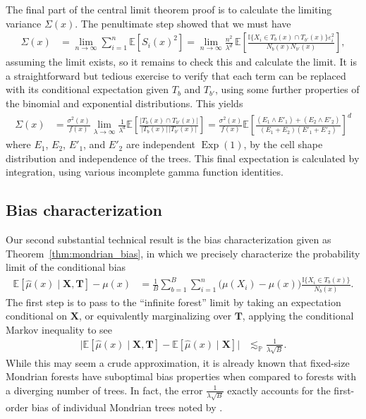 \documentclass[11pt,lof]{puthesis}
\renewcommand{\P}{\ensuremath{\mathbb{P}}}
\newcommand{\E}{\ensuremath{\mathbb{E}}}
\newcommand{\I}{\ensuremath{\mathbb{I}}}
\newcommand{\bX}{\ensuremath{\mathbf{X}}}
\newcommand{\bT}{\ensuremath{\mathbf{T}}}
\DeclareMathOperator{\Exp}{Exp}
\theoremstyle{break}
\theoremstyle{proof}
\begin{document}
The final part of the central limit theorem proof is to calculate the limiting
variance $\Sigma(x)$. The penultimate step showed that we must have
%
\begin{align*}
  \Sigma(x)
  &= \lim_{n \to \infty} \sum_{i=1}^n \E \left[S_i(x)^2 \right]
  = \lim_{n \to \infty}
  \frac{n^2}{\lambda^d} \,
  \E \left[
    \frac{\I\{X_i \in T_b(x) \cap T_{b'}(x)\} \varepsilon_i^2}
    {N_{b}(x) N_{b'}(x)}
  \right],
\end{align*}
%
assuming the limit exists, so it remains to check this and calculate the limit.
It is a straightforward but tedious exercise to verify that each term can be
replaced with its conditional expectation given $T_b$ and $T_{b'}$, using some
further properties of the binomial and exponential distributions. This yields
%
\begin{align*}
  \Sigma(x)
  &=
  \frac{\sigma^2(x)}{f(x)}
  \lim_{\lambda \to \infty}
  \frac{1}{\lambda^d}
  \E \left[
    \frac{|T_{b}(x) \cap T_{b'}(x)|}
    {|T_{b}(x)| \, |T_{b'}(x)|}
  \right]
  = \frac{\sigma^2(x)}{f(x)}
  \E \left[
    \frac{(E_{1} \wedge E'_{1}) + (E_{2} \wedge E'_{2})}
    {(E_{1} + E_{2}) (E'_{1} + E'_{2})}
  \right]^d
\end{align*}
%
where $E_1$, $E_2$, $E'_1$, and $E'_2$ are independent $\Exp(1)$,
by the cell shape distribution and independence of the trees. This final
expectation is calculated by integration, using various incomplete gamma
function identities.

\subsection*{Bias characterization}

Our second substantial technical result is the bias characterization
given as Theorem~\ref{thm:mondrian_bias}, in which we precisely
characterize the probability limit of the conditional bias
%
\begin{align*}
  \E \left[ \hat \mu(x) \mid \bX, \bT \right]
  - \mu(x)
  &=
  \frac{1}{B} \sum_{b=1}^B
  \sum_{i=1}^n \big( \mu(X_i) - \mu(x) \big)
  \frac{\I\{X_i \in T_b(x)\}}{N_b(x)}.
\end{align*}
%
The first step is to pass to the ``infinite forest''
limit by taking an expectation conditional on $\bX$, or equivalently
marginalizing over $\bT$, applying the conditional Markov inequality
to see
%
\begin{align*}
  \big|
  \E \left[ \hat \mu(x) \mid \bX, \bT \right]
  - \E \left[ \hat \mu(x) \mid \bX \right]
  \big|
  &\lesssim_\P
  \frac{1}{\lambda \sqrt B}.
\end{align*}
%
While this may seem a crude approximation, it is already known that fixed-size
Mondrian forests have suboptimal bias properties when compared to forests with
a diverging number of trees. In fact, the error $\frac{1}{\lambda \sqrt B}$
exactly accounts for the first-order bias of individual Mondrian trees noted by
\citet{mourtada2020minimax}.
\end{document}
